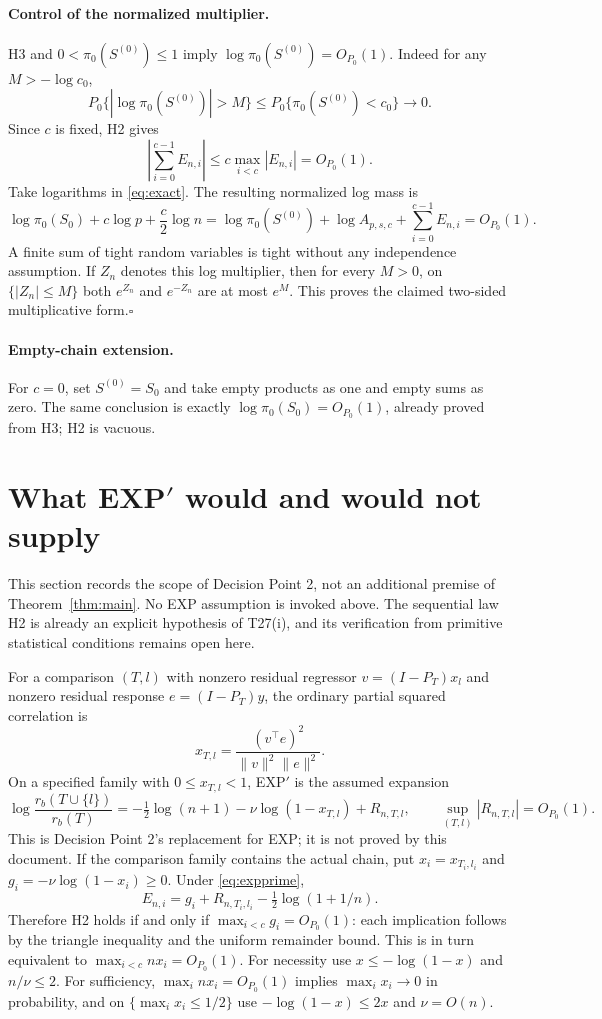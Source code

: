 ﻿\documentclass[11pt]{article}
\newcommand{\Op}{O_{P_0}}
\begin{document}
\paragraph{Control of the normalized multiplier.}
H3 and $0<\pi_0(S^{(0)})\le1$ imply $\log\pi_0(S^{(0)})=\Op(1)$. Indeed for any $M> -\log c_0$,
\[
 P_0\{|\log\pi_0(S^{(0)})|>M\}
 \le P_0\{\pi_0(S^{(0)})<c_0\}\longrightarrow0.
\]
Since $c$ is fixed, H2 gives
\[
 \left|\sum_{i=0}^{c-1}E_{n,i}\right|
 \le c\max_{i<c}|E_{n,i}|=\Op(1).
\]
Take logarithms in \eqref{eq:exact}. The resulting normalized log mass is
\[
 \log\pi_0(S_0)+c\log p+\frac c2\log n
 =\log\pi_0(S^{(0)})+\log A_{p,s,c}+\sum_{i=0}^{c-1}E_{n,i}
 =\Op(1).
\]
A finite sum of tight random variables is tight without any independence assumption. If $Z_n$ denotes this log multiplier, then for every $M>0$, on $\{|Z_n|\le M\}$ both $e^{Z_n}$ and $e^{-Z_n}$ are at most $e^M$. This proves the claimed two-sided multiplicative form.\hfill$\square$

\paragraph{Empty-chain extension.} For $c=0$, set $S^{(0)}=S_0$ and take empty products as one and empty sums as zero. The same conclusion is exactly $\log\pi_0(S_0)=\Op(1)$, already proved from H3; H2 is vacuous.

\clearpage
\section{What EXP\texorpdfstring{$'$}{'} would and would not supply}
This section records the scope of Decision Point 2, not an additional premise of Theorem~\ref{thm:main}. No EXP assumption is invoked above. The sequential law H2 is already an explicit hypothesis of T27(i), and its verification from primitive statistical conditions remains open here.

For a comparison $(T,l)$ with nonzero residual regressor $v=(I-P_T)x_l$ and nonzero residual response $e=(I-P_T)y$, the ordinary partial squared correlation is
\[
 x_{T,l}=\frac{(v^\top e)^2}{\|v\|^2\|e\|^2}.
\]
On a specified family with $0\le x_{T,l}<1$, EXP$'$ is the assumed expansion
\begin{equation}\label{eq:expprime}
 \log\frac{r_b(T\cup\{l\})}{r_b(T)}
 =-\tfrac12\log(n+1)-\nu\log(1-x_{T,l})+R_{n,T,l},
 \qquad \sup_{(T,l)}|R_{n,T,l}|=\Op(1).
\end{equation}
This is Decision Point 2's replacement for EXP; it is not proved by this document. If the comparison family contains the actual chain, put $x_i=x_{T_i,l_i}$ and $g_i=-\nu\log(1-x_i)\ge0$. Under \eqref{eq:expprime},
\[
 E_{n,i}=g_i+R_{n,T_i,l_i}-\tfrac12\log(1+1/n).
\]
Therefore H2 holds if and only if $\max_{i<c}g_i=\Op(1)$: each implication follows by the triangle inequality and the uniform remainder bound. This is in turn equivalent to $\max_{i<c}nx_i=\Op(1)$. For necessity use $x\le-\log(1-x)$ and $n/\nu\le2$. For sufficiency, $\max_i nx_i=\Op(1)$ implies $\max_i x_i\to0$ in probability, and on $\{\max_i x_i\le1/2\}$ use $-\log(1-x)\le2x$ and $\nu=O(n)$.
\end{document}
